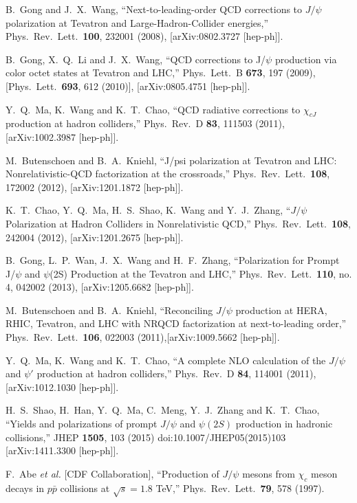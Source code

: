 \documentclass[aps,prc,preprint,superscriptaddress,showpacs,showkeys,amsmath]{revtex4-1}
\begin{document}
\begin{thebibliography}{100}
  B.~Gong and J.~X.~Wang,
  ``Next-to-leading-order QCD corrections to $J/\psi$ polarization at Tevatron and Large-Hadron-Collider energies,''
  Phys.\ Rev.\ Lett.\  {\bf 100}, 232001 (2008),
  [arXiv:0802.3727 [hep-ph]].
  

  B.~Gong, X.~Q.~Li and J.~X.~Wang,
  ``QCD corrections to J/$\psi$ production via color octet states at Tevatron and LHC,''
  Phys.\ Lett.\ B {\bf 673}, 197 (2009),
  [Phys.\ Lett.\  {\bf 693}, 612 (2010)],
  [arXiv:0805.4751 [hep-ph]].
  
  Y.~Q.~Ma, K.~Wang and K.~T.~Chao,
  ``QCD radiative corrections to $\chi_{cJ}$ production at hadron colliders,''
  Phys.\ Rev.\ D {\bf 83}, 111503 (2011),
  [arXiv:1002.3987 [hep-ph]].


  M.~Butenschoen and B.~A.~Kniehl,
  ``J/psi polarization at Tevatron and LHC: Nonrelativistic-QCD factorization at the crossroads,''
  Phys.\ Rev.\ Lett.\  {\bf 108}, 172002 (2012),
  [arXiv:1201.1872 [hep-ph]].
  
  K.~T.~Chao, Y.~Q.~Ma, H.~S.~Shao, K.~Wang and Y.~J.~Zhang,
  ``$J/\psi$ Polarization at Hadron Colliders in Nonrelativistic QCD,''
  Phys.\ Rev.\ Lett.\  {\bf 108}, 242004 (2012),
  [arXiv:1201.2675 [hep-ph]].
  
  B.~Gong, L.~P.~Wan, J.~X.~Wang and H.~F.~Zhang,
  ``Polarization for Prompt J/$\psi$ and $\psi$(2S) Production at the Tevatron and LHC,''
  Phys.\ Rev.\ Lett.\  {\bf 110}, no. 4, 042002 (2013),
  [arXiv:1205.6682 [hep-ph]].
 
  M.~Butenschoen and B.~A.~Kniehl,
  ``Reconciling $J/\psi$ production at HERA, RHIC, Tevatron, and LHC with NRQCD factorization at next-to-leading order,''
  Phys.\ Rev.\ Lett.\  {\bf 106}, 022003 (2011),[arXiv:1009.5662 [hep-ph]].
 

  Y.~Q.~Ma, K.~Wang and K.~T.~Chao,
  ``A complete NLO calculation of the $J/\psi$ and $\psi'$ production at hadron colliders,''
  Phys.\ Rev.\ D {\bf 84}, 114001 (2011),
  [arXiv:1012.1030 [hep-ph]].


  H.~S.~Shao, H.~Han, Y.~Q.~Ma, C.~Meng, Y.~J.~Zhang and K.~T.~Chao,
  ``Yields and polarizations of prompt $J/\psi$ and $\psi(2S)$ production in hadronic collisions,''
  JHEP {\bf 1505}, 103 (2015)
  doi:10.1007/JHEP05(2015)103
  [arXiv:1411.3300 [hep-ph]].


  F.~Abe {\it et al.} [CDF Collaboration],
  ``Production of $J/\psi$ mesons from $\chi_c$ meson decays in $p\bar{p}$ collisions at $\sqrt{s} = 1.8$ TeV,''
  Phys.\ Rev.\ Lett.\  {\bf 79}, 578 (1997).


\end{thebibliography}
\end{document}
